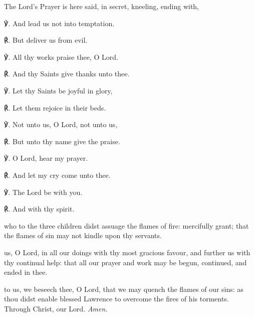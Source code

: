 \begin{multicols}{2}
\newcolumn

\begin{rubric}
    {The Lord's Prayer is here said, in secret, kneeling, ending with,}
\end{rubric}

℣. And lead us not into temptation.

℟. But deliver us from evil.

℣. All thy works praise thee, O Lord.

℟. And thy Saints give thanks unto thee.

℣. Let thy Saints be joyful in glory,

℟. Let them rejoice in their beds.

℣. Not unto us, O Lord, not unto us,

℟. But unto thy name give the praise.

℣. O Lord, hear my prayer.

℟. And let my cry come unto thee.

℣. The Lord be with you.

℟. And with thy spirit.

{} who to the three children didst assuage the flames of fire: mercifully grant; that the flames of sin may not kindle upon thy servants.

 us, O Lord, in all our doings with thy most gracious favour, and further us with thy continual help: that all our prayer and work may be begun, continued, and ended in thee.

 to us, we beseech thee, O Lord, that we may quench the flames of our sins: as thou didst enable blessed Lawrence to overcome the fires of his torments. Through Christ, our Lord. \textit{Amen.}
\end{multicols}